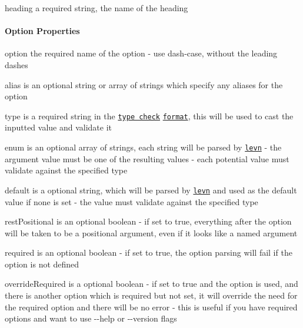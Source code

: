 \begin{DoxyItemize}
\item {\ttfamily heading} a required string, the name of the heading
\end{DoxyItemize}

\paragraph*{Option Properties}


\begin{DoxyItemize}
\item {\ttfamily option} the required name of the option -\/ use dash-\/case, without the leading dashes
\item {\ttfamily alias} is an optional string or array of strings which specify any aliases for the option
\item {\ttfamily type} is a required string in the \href{https://github.com/gkz/type-check}{\tt type check} \href{https://github.com/gkz/type-check#type-format}{\tt format}, this will be used to cast the inputted value and validate it
\item {\ttfamily enum} is an optional array of strings, each string will be parsed by \href{https://github.com/gkz/levn}{\tt levn} -\/ the argument value must be one of the resulting values -\/ each potential value must validate against the specified {\ttfamily type}
\item {\ttfamily default} is a optional string, which will be parsed by \href{https://github.com/gkz/levn}{\tt levn} and used as the default value if none is set -\/ the value must validate against the specified {\ttfamily type}
\item {\ttfamily rest\+Positional} is an optional boolean -\/ if set to {\ttfamily true}, everything after the option will be taken to be a positional argument, even if it looks like a named argument
\item {\ttfamily required} is an optional boolean -\/ if set to {\ttfamily true}, the option parsing will fail if the option is not defined
\item {\ttfamily override\+Required} is a optional boolean -\/ if set to {\ttfamily true} and the option is used, and there is another option which is required but not set, it will override the need for the required option and there will be no error -\/ this is useful if you have required options and want to use {\ttfamily -\/-\/help} or {\ttfamily -\/-\/version} flags

\end{DoxyItemize}
